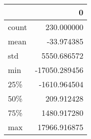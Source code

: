 \begin{tabular}{lr}
\toprule
{} &             0 \\
\midrule
count &    230.000000 \\
mean  &    -33.974385 \\
std   &   5550.686572 \\
min   & -17050.289456 \\
25\%   &  -1610.964504 \\
50\%   &    209.912428 \\
75\%   &   1480.917280 \\
max   &  17966.916875 \\
\bottomrule
\end{tabular}
